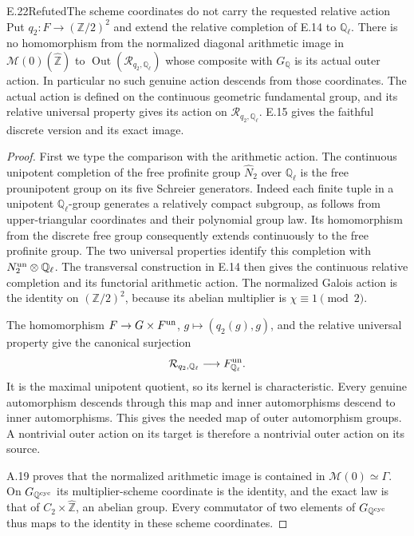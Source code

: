 \begin{statement}{E.22}{Refuted}{The scheme coordinates do not carry the requested relative action}
Put $q_2:F\to(\mathbb Z/2)^2$ and extend the relative completion
of E.14 to $\mathbb Q_\ell$. There is no homomorphism from the
normalized diagonal arithmetic image in
$\mathcal M(0)(\widehat{\mathbb Z})$ to
$\operatorname{Out}(\mathcal R_{q_2,\mathbb Q_\ell})$
whose composite with $G_{\mathbb Q}$ is its actual outer action.
In particular no such genuine action descends from those coordinates.
The actual action is defined on the continuous geometric
fundamental group, and its relative universal property gives its
action on $\mathcal R_{q_2,\mathbb Q_\ell}$. E.15 gives the
faithful discrete version and its exact image.
\end{statement}
\begin{proof}
First we type the comparison with the arithmetic action. The continuous
unipotent completion of the free profinite group $\widehat N_2$
over $\mathbb Q_\ell$ is the free prounipotent group on its five
Schreier generators. Indeed each finite tuple in a unipotent
$\mathbb Q_\ell$-group generates a relatively compact subgroup,
as follows from upper-triangular coordinates and their polynomial
group law. Its homomorphism from the discrete free group consequently
extends continuously to the free profinite group. The two universal
properties identify this completion with
$N_2^{\rm un}\otimes\mathbb Q_\ell$. The transversal construction
in E.14 then gives the continuous relative completion and its
functorial arithmetic action. The normalized Galois action is the
identity on $(\mathbb Z/2)^2$, because its abelian multiplier is
$\chi\equiv1\pmod2$.

The homomorphism $F\to G\times F^{\rm un}$, $g\mapsto(q_2(g),g)$,
and the relative universal property give the canonical surjection
\[
 \mathcal R_{q_2,\mathbb Q_\ell}\longrightarrow
 F^{\rm un}_{\mathbb Q_\ell}.
\]
It is the maximal unipotent quotient, so its kernel is characteristic.
Every genuine automorphism descends through this map and inner
automorphisms descend to inner automorphisms. This gives the needed
map of outer automorphism groups. A nontrivial outer action on its
target is therefore a nontrivial outer action on its source.

A.19 proves that the normalized arithmetic image is contained in
$\mathcal M(0)\simeq\Gamma$. On $G_{\mathbb Q^{\rm cyc}}$ its
multiplier-scheme coordinate is the identity, and the exact law is
that of $C_2\times\widehat{\mathbb Z}$, an abelian group.
Every commutator of two elements of $G_{\mathbb Q^{\rm cyc}}$
thus maps to the identity in these scheme coordinates.


\end{proof}
